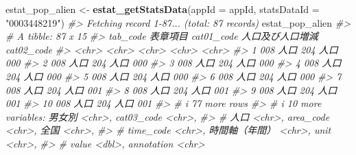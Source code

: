 \documentclass[
  xelatex, ja=standard]{bxjsbook}
\newenvironment{Shaded}{\begin{snugshade}}{\end{snugshade}}
\newcommand{\AttributeTok}[1]{\textcolor[rgb]{0.13,0.29,0.53}{#1}}
\newcommand{\CommentTok}[1]{\textcolor[rgb]{0.56,0.35,0.01}{\textit{#1}}}
\newcommand{\FunctionTok}[1]{\textcolor[rgb]{0.13,0.29,0.53}{\textbf{#1}}}
\newcommand{\NormalTok}[1]{#1}
\newcommand{\OtherTok}[1]{\textcolor[rgb]{0.56,0.35,0.01}{#1}}
\newcommand{\StringTok}[1]{\textcolor[rgb]{0.31,0.60,0.02}{#1}}
\theoremstyle{definition}
\theoremstyle{definition}
\theoremstyle{definition}
\theoremstyle{definition}
\theoremstyle{remark}
\begin{document}
\begin{Shaded}
\begin{Highlighting}[]
\NormalTok{estat\_pop\_alien }\OtherTok{\textless{}{-}} \FunctionTok{estat\_getStatsData}\NormalTok{(}\AttributeTok{appId =}\NormalTok{ appId, }\AttributeTok{statsDataId =} \StringTok{"0003448219"}\NormalTok{)}
\CommentTok{\#\textgreater{} Fetching record 1{-}87... (total: 87 records)}
\NormalTok{estat\_pop\_alien}
\CommentTok{\#\textgreater{} \# A tibble: 87 x 15}
\CommentTok{\#\textgreater{}    tab\_code 表章項目 cat01\_code 人口及び人口増減 cat02\_code}
\CommentTok{\#\textgreater{}    \textless{}chr\textgreater{}    \textless{}chr\textgreater{}    \textless{}chr\textgreater{}      \textless{}chr\textgreater{}            \textless{}chr\textgreater{}     }
\CommentTok{\#\textgreater{}  1 008      人口     204        人口             000       }
\CommentTok{\#\textgreater{}  2 008      人口     204        人口             000       }
\CommentTok{\#\textgreater{}  3 008      人口     204        人口             000       }
\CommentTok{\#\textgreater{}  4 008      人口     204        人口             000       }
\CommentTok{\#\textgreater{}  5 008      人口     204        人口             000       }
\CommentTok{\#\textgreater{}  6 008      人口     204        人口             000       }
\CommentTok{\#\textgreater{}  7 008      人口     204        人口             001       }
\CommentTok{\#\textgreater{}  8 008      人口     204        人口             001       }
\CommentTok{\#\textgreater{}  9 008      人口     204        人口             001       }
\CommentTok{\#\textgreater{} 10 008      人口     204        人口             001       }
\CommentTok{\#\textgreater{} \# i 77 more rows}
\CommentTok{\#\textgreater{} \# i 10 more variables: 男女別 \textless{}chr\textgreater{}, cat03\_code \textless{}chr\textgreater{},}
\CommentTok{\#\textgreater{} \#   人口 \textless{}chr\textgreater{}, area\_code \textless{}chr\textgreater{}, 全国 \textless{}chr\textgreater{},}
\CommentTok{\#\textgreater{} \#   time\_code \textless{}chr\textgreater{}, \textasciigrave{}時間軸（年間）\textasciigrave{} \textless{}chr\textgreater{}, unit \textless{}chr\textgreater{},}
\CommentTok{\#\textgreater{} \#   value \textless{}dbl\textgreater{}, annotation \textless{}chr\textgreater{}}
\end{Highlighting}
\end{Shaded}
\end{document}
